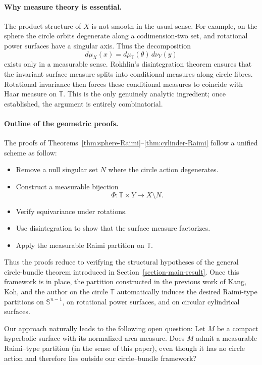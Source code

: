 \documentclass[11pt]{article}
\numberwithin{equation}{section}
\theoremstyle{remark}
\begin{document}
\paragraph{Why measure theory is essential.}
The product structure of $X$ is not smooth in the usual sense. For example, on the sphere the circle orbits degenerate along a codimension-two set, and rotational power surfaces have a singular axis.
Thus the decomposition
\[
d\mu_X(x)=d\mu_{\mathbb{T}}(\theta)\,d\nu_Y(y)
\]
exists only in a measurable sense. Rokhlin’s disintegration theorem ensures that the invariant surface measure splits into conditional measures along circle fibres.
Rotational invariance then forces these conditional measures to coincide with Haar measure on $\mathbb{T}$.
This is the only genuinely analytic ingredient;
once established, the argument is entirely combinatorial.

\paragraph{Outline of the geometric proofs.}
The proofs of Theorems~\ref{thm:sphere-Raimi}–\ref{thm:cylinder-Raimi} follow a unified scheme as follow:
\begin{itemize}
\item Remove a null singular set $N$ where the circle action degenerates.
\item Construct a measurable bijection
      \[
      \Phi:\mathbb{T}\times Y\to X\setminus N.
      \]
\item Verify equivariance under rotations.
\item Use disintegration to show that the surface measure factorizes.
\item Apply the measurable Raimi partition on $\mathbb{T}$.
\end{itemize}

Thus the proofs reduce to verifying the structural hypotheses of the general circle-bundle theorem introduced in Section~\ref{section-main-result}.
Once this framework is in place, the partition constructed in the previous work of Kang, Koh, and the author on the circle $\mathbb{T}$ automatically induces the desired Raimi-type partitions on $\mathbb{S}^{n-1}$,
on rotational power surfaces,
and on circular cylindrical surfaces.

\medskip



Our approach naturally leads to the following open question: 
Let $M$ be a compact hyperbolic surface with its normalized area measure. Does $M$ admit a measurable Raimi--type partition (in the sense of this paper), even though it has no circle action and therefore lies outside our circle--bundle framework?
\end{document}
